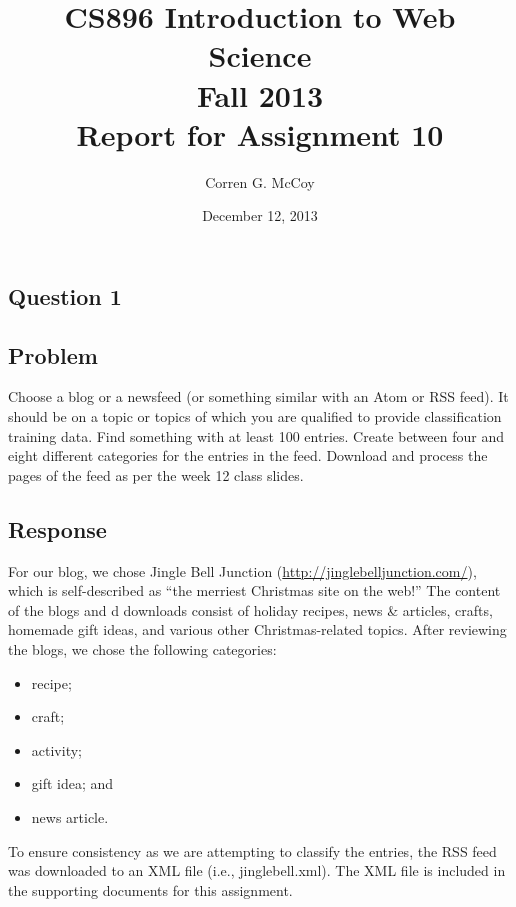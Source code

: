 \documentclass[letterpaper,11pt]{report}
\begin{document}
 
\begin{savenotes}
\pagestyle{plain}
\title{CS896 Introduction to Web Science\\Fall 2013\\Report for Assignment 10}
\author{Corren G. McCoy}
 
\date{December 12, 2013}
\maketitle

\renewcommand*\thesection{\arabic{section}}
\setcounter{section}{0}

\setcounter{tocdepth}{4}
\tableofcontents
 \listoftables
\newpage


\section{Question 1}
\subsection{Problem}Choose a blog or a newsfeed (or something similar with an Atom or RSS feed).  It should be on a topic or topics of which you are  qualified to provide classification training data.  Find something with at least 100 entries. Create between four and eight different categories for the entries in the feed. Download and process the pages of the feed as per the week 12 class slides.

\subsection{Response}For our blog, we chose Jingle Bell Junction (\url{http://jinglebelljunction.com/}), which is self-described as ``the merriest Christmas site on the web!'' The content of the blogs and d downloads consist of holiday recipes, news \& articles, crafts, homemade gift ideas, and various other Christmas-related topics. After reviewing the blogs, we chose the following categories:
\begin{itemize}
\item recipe;
\item craft;
\item activity;
\item gift idea; and
\item news article.
\end{itemize}
To ensure consistency as we are attempting to classify the entries, the RSS feed was downloaded to an XML file (i.e., jinglebell.xml). The XML file is included in the supporting documents for this assignment.


\end{savenotes}
\end{document}
